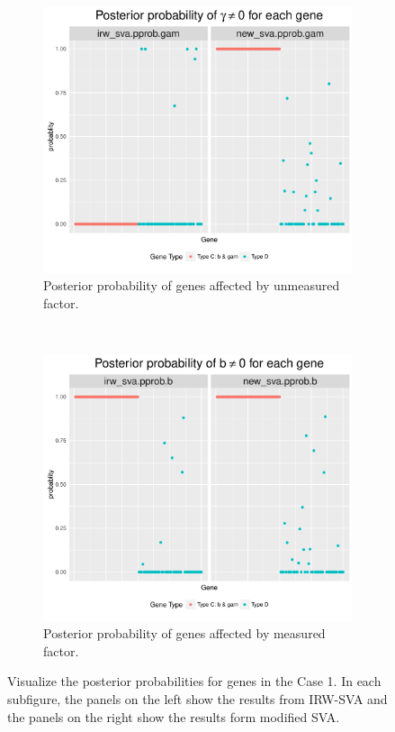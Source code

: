 \documentclass[11pt]{article}
\begin{document}
\begin{figure}[h!]
    \centering
    \begin{subfigure}[t]{0.4\textwidth}
    \centering
    \includegraphics[width = \textwidth]{figures/pprop1_1.pdf}
    \caption{Posterior probability of genes affected by unmeasured factor.}
    \label{fig:pprob1_1}
    \end{subfigure}
~    
    \begin{subfigure}[t]{0.4\textwidth}
    \centering
    \includegraphics[width = \textwidth]{figures/pprop1_2.pdf}
    \caption{Posterior probability of genes affected by measured factor.}
    \label{fig:pprob1_2}
    \end{subfigure}
    \caption{Visualize the posterior probabilities for genes in the Case 1. In each subfigure, the panels on the left show the results from IRW-SVA and the panels on the right show the results form modified SVA.}
    \label{fig:visual1}
\end{figure}
\end{document}
